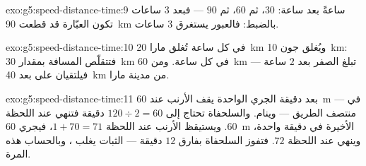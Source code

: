 \begin{solution}{exo:g5:speed-distance-time:9}
ساعةً بعد ساعة: $30$، ثم $60$، ثم $90$ --- فبعد $3$ ساعات تكون
العبّارة قد قطعت \qty{90}{km} بالضبط: فالعبور يستغرق $3$ ساعات.
\end{solution}

\begin{solution}{exo:g5:speed-distance-time:10}
في كل ساعة تُغلق مارا \qty{20}{km} ويُغلق جون \qty{10}{km}:
فتتقلّص المسافة بمقدار \qty{30}{km} في كل ساعة. ومن \qty{60}{km}
تبلغ الصفر بعد $2$ ساعة --- فيلتقيان على بعد \qty{40}{km} من
مدينة مارا.
\end{solution}

\begin{solution}{exo:g5:speed-distance-time:11}
بعد دقيقة الجري الواحدة يقف الأرنب عند \qty{60}{m} --- في منتصف
الطريق --- وينام. والسلحفاة تحتاج إلى $120 \div 2 = 60$ دقيقة
فتنهي عند اللحظة $60$. ويستيقظ الأرنب عند اللحظة $1 + 70 = 71$،
فيجري \qty{60}{m} الأخيرة في دقيقة واحدة، وينهي عند اللحظة
$72$. فتفوز السلحفاة بفارق $12$ دقيقة --- الثبات يغلب ،
وبالحساب هذه المرة.
\end{solution}
